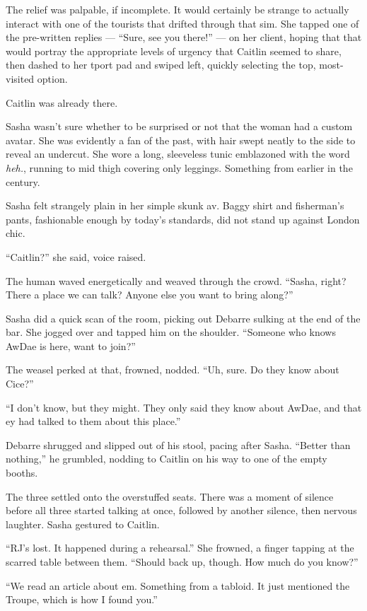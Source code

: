The relief was palpable, if incomplete. It would certainly be strange to actually interact with one of the tourists that drifted through that sim. She tapped one of the pre-written replies — ``Sure, see you there!'' — on her client, hoping that that would portray the appropriate levels of urgency that Caitlin seemed to share, then dashed to her tport pad and swiped left, quickly selecting the top, most-visited option.

Caitlin was already there.

Sasha wasn't sure whether to be surprised or not that the woman had a custom avatar. She was evidently a fan of the past, with hair swept neatly to the side to reveal an undercut. She wore a long, sleeveless tunic emblazoned with the word \emph{heh.}, running to mid thigh covering only leggings. Something from earlier in the century.

Sasha felt strangely plain in her simple skunk av. Baggy shirt and fisherman's pants, fashionable enough by today's standards, did not stand up against London chic.

``Caitlin?'' she said, voice raised.

The human waved energetically and weaved through the crowd. ``Sasha, right? There a place we can talk? Anyone else you want to bring along?''

Sasha did a quick scan of the room, picking out Debarre sulking at the end of the bar. She jogged over and tapped him on the shoulder. ``Someone who knows AwDae is here, want to join?''

The weasel perked at that, frowned, nodded. ``Uh, sure. Do they know about Cice?''

``I don't know, but they might. They only said they know about AwDae, and that ey had talked to them about this place.''

Debarre shrugged and slipped out of his stool, pacing after Sasha. ``Better than nothing,'' he grumbled, nodding to Caitlin on his way to one of the empty booths.

The three settled onto the overstuffed seats. There was a moment of silence before all three started talking at once, followed by another silence, then nervous laughter. Sasha gestured to Caitlin.

``RJ's lost. It happened during a rehearsal.'' She frowned, a finger tapping at the scarred table between them. ``Should back up, though. How much do you know?''

``We read an article about em. Something from a tabloid. It just mentioned the Troupe, which is how I found you.''

